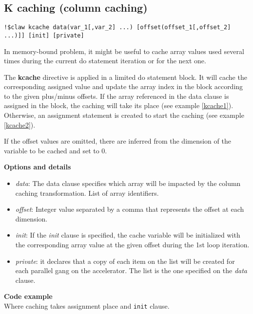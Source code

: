 \subsection{K caching (column caching)}
\begin{lstlisting}
!$claw kcache data(var_1[,var_2] ...) [offset(offset_1[,offset_2] ...)]] [init] [private]
\end{lstlisting}

In memory-bound problem, it might be useful to cache array values used several
times during the current do statement iteration or for the next one.

The \textbf{kcache} directive is applied in a limited do statement block. It
will cache the corresponding assigned value and update the array index in the
block according to the given plus/minus offsets. If the array referenced in the
data clause is assigned in the block, the caching will take its place (see
example \ref{kcache1}). Otherwise, an assignment statement is created to start
the caching (see example \ref{kcache2}).

If the offset values are omitted, there are inferred from the dimension of the
variable to be cached and set to 0.

\textbf{Options and details}
\begin{itemize}
\item \textit{data}: The data clause specifies which array will be impacted by
the column caching transformation. List of array identifiers.
\item \textit{offset}: Integer value separated by a comma that represents the
offset at each dimension.
\item \textit{init}: If the \textit{init} clause is specified, the cache
variable will be initialized with the corresponding array value at the given
offset during the 1st loop iteration.
\item \textit{private}: it declares that a copy of each item on the list will
be created for each parallel gang on the accelerator. The list is the one
specified on the \textit{data} clause.
\end{itemize}

\textbf{Code example}\\
\label{kcache1}
Where caching takes assignment place and \lstinline!init! clause.

